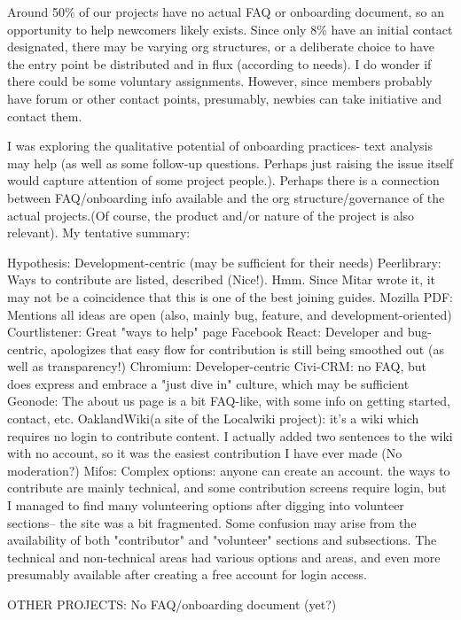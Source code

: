 Around 50\% of our projects have no actual FAQ or onboarding document, so an opportunity to help newcomers likely exists. Since only 8\% have an initial contact designated, there may be varying org structures, or a deliberate choice to have the entry point be distributed and in flux (according to needs). I do wonder if there could be some voluntary assignments. However, since members probably have forum or other contact points, presumably, newbies can take initiative and contact them.

I was exploring the qualitative potential of onboarding practices- text analysis may help (as well as some follow-up questions. Perhaps just raising the issue itself would capture attention of some project people.). Perhaps there is a connection between FAQ/onboarding info available and the org structure/governance of the actual projects.(Of course, the product and/or nature of the project is also relevant). My tentative summary:

Hypothesis: Development-centric (may be sufficient for their needs)
Peerlibrary: Ways to contribute are listed, described (Nice!). Hmm. Since Mitar wrote it, it may not be a coincidence that this is one of the best joining guides.
Mozilla PDF: Mentions all ideas are open (also, mainly bug, feature, and development-oriented)
Courtlistener: Great "ways to help" page
Facebook React: Developer and bug-centric, apologizes that easy flow for contribution is still being smoothed out (as well as transparency!)
Chromium: Developer-centric
Civi-CRM: no FAQ, but does express and embrace a  "just dive in" culture, which may be sufficient
Geonode: The about us page is a bit FAQ-like, with some info on getting started, contact, etc.
OaklandWiki(a site of the Localwiki project): it's a wiki which requires no login to contribute content. I actually added two sentences to the wiki with no account, so it was the easiest contribution I have ever made (No moderation?)
Mifos: Complex options: anyone can create an account. the ways to contribute are mainly technical, and some contribution screens require login, but I managed to find many volunteering options after digging into volunteer sections-- the site was a bit fragmented. Some confusion may arise from the availability of both "contributor" and "volunteer" sections and subsections. The technical and non-technical areas had various options and areas, and even more presumably available after creating a free account for login access.

OTHER PROJECTS: No FAQ/onboarding document (yet?)




